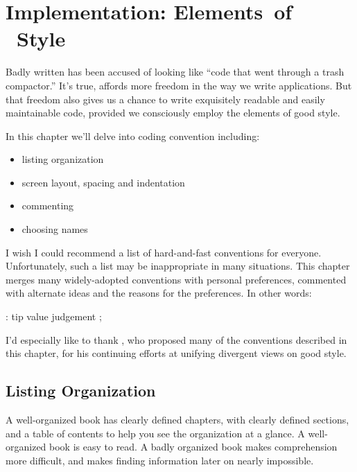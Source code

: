 
\chapter{Implementation: Elements~of \Forth{}~Style}%
%

\initial Badly written \Forth{} has been accused of looking like ``code that
went through a trash compactor.'' It's true, \Forth{} affords more
freedom in the way we write applications.  But that freedom also gives
us a chance to write exquisitely readable and easily maintainable
code, provided we consciously employ the elements of good \Forth{}
style.

In this chapter we'll delve into \Forth{} coding convention
including:

\begin{itemize}%
\item listing organization
\item screen layout, spacing and indentation
\item commenting
\item choosing names
\end{itemize}
I wish I could recommend a list of hard-and-fast conventions for
everyone.  Unfortunately, such a list may be inappropriate in many
situations.  This chapter merges many widely-adopted conventions with
personal preferences, commented with alternate ideas and the reasons
for the preferences.  In other words:
\begin{Code}
: tip  value judgement ;
\end{Code}
I'd especially like to thank , who
proposed many of the conventions described in this chapter, for his
continuing efforts at unifying divergent views on good \Forth{} style.

\section{Listing Organization}%
%

A well-organized book has clearly defined chapters, with clearly defined
sections, and a table of contents to help you see the organization at a
glance.  A well-organized book is easy to read.  A badly organized book
makes comprehension more difficult, and makes finding information
later on nearly impossible.

